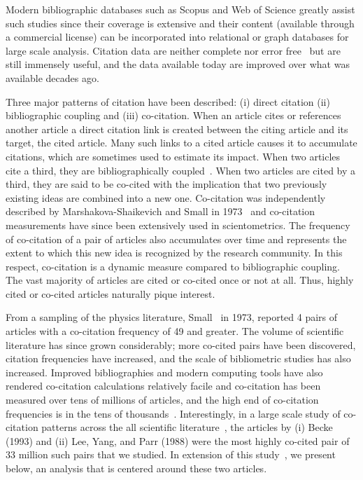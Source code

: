 \documentclass[11pt, oneside]{article}   	%
\begin{document}
Modern bibliographic databases such as Scopus and Web of Science greatly assist such studies since their coverage is extensive and their content (available through a commercial license) can be incorporated into relational or graph databases for large scale analysis. Citation data are neither complete nor error free~\citep{macroberts2017} but are still immensely useful, and the data available today are improved over what was available decades ago. 

Three major patterns of citation have been described: (i) direct citation (ii) bibliographic coupling and (iii) co-citation. When an article cites or references another article a direct citation link is created between the citing article and its target, the cited article. Many such links to a cited article causes it to accumulate citations, which are sometimes used to estimate its impact. When two articles cite a third, they are bibliographically coupled~\citep{Kessler1963}. When two articles are cited by a third, they are said to be co-cited with the implication that two previously existing ideas are combined into a new one. Co-citation was independently described by Marshakova-Shaikevich and Small in 1973~\citep{MarshakovaShaikevich1973,Small1973} and co-citation measurements have since been extensively used in scientometrics. The frequency of co-citation of a pair of articles  also accumulates over time and represents the extent to which this new idea is recognized by the research community. In this respect, co-citation is a dynamic measure compared to bibliographic coupling. The vast majority of articles are cited or co-cited once or not at all. Thus, highly cited or co-cited articles naturally pique interest. 


From a sampling of the physics literature, Small~\citep{Small1973} in 1973, reported 4 pairs of articles with a co-citation frequency of 49 and greater. The volume of scientific literature has since grown considerably; more co-cited pairs have been discovered, citation frequencies have increased, and the scale of bibliometric studies has also increased. Improved bibliographies and modern computing tools have also rendered co-citation calculations relatively facile and co-citation has been measured over tens of millions of articles, and the high end of co-citation frequencies is in the tens of thousands~\citep{Stringer2010,Uzzi2013,devarakonda_2020}. Interestingly, in a large scale study of co-citation patterns across the all scientific literature~\citep{devarakonda_2020}, the articles by (i) Becke (1993)\citep{becke1993dft} and (ii) Lee, Yang, and Parr (1988)\citep{lyp1988} were the most highly co-cited pair of 33 million such pairs that we studied. In extension of this study~\citep{devarakonda_2020}, we present below, an analysis that is centered around these two articles. 
\end{document}
